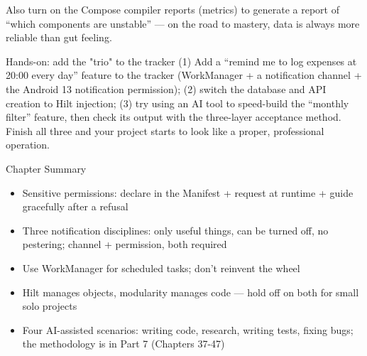 Also turn on the Compose compiler reports (metrics) to generate a report of “which components are unstable” — on the road to mastery, data is always more reliable than gut feeling.

\begin{tcbpractice}{Hands-on: add the "trio" to the tracker}
(1) Add a “remind me to log expenses at 20:00 every day” feature to the tracker (WorkManager + a notification channel + the Android 13 notification permission); (2) switch the database and API creation to Hilt injection; (3) try using an AI tool to speed-build the “monthly filter” feature, then check its output with the three-layer acceptance method. Finish all three and your project starts to look like a proper, professional operation.

\end{tcbpractice}

\begin{tcbsummary}{Chapter Summary}
\begin{itemize}
  \item Sensitive permissions: declare in the Manifest + request at runtime + guide gracefully after a refusal
  \item Three notification disciplines: only useful things, can be turned off, no pestering; channel + permission, both required
  \item Use WorkManager for scheduled tasks; don't reinvent the wheel
  \item Hilt manages objects, modularity manages code — hold off on both for small solo projects
  \item Four AI-assisted scenarios: writing code, research, writing tests, fixing bugs; the methodology is in Part 7 (Chapters 37-47)
\end{itemize}

\end{tcbsummary}
